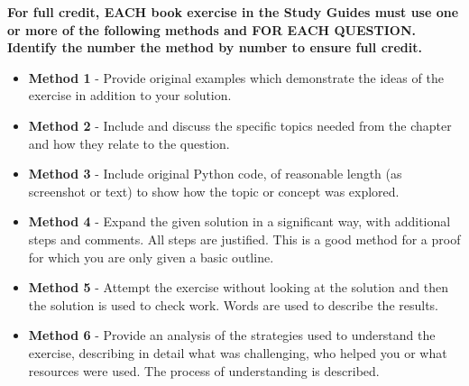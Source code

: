 \textbf{For full credit,  EACH book exercise in the Study Guides must use one or more of the following methods and FOR EACH QUESTION.  Identify the number the method by number to ensure full credit.}

\begin{itemize}
    \item \textbf{Method 1} - Provide original examples which demonstrate the ideas of the exercise in addition to your solution.
    \item \textbf{Method 2} - Include and discuss the specific topics needed from the chapter and how they relate to the question.
    \item \textbf{Method 3} - Include original Python code, of reasonable length (as screenshot or text)  to show how the topic or concept was explored.
    \item \textbf{Method 4} - Expand the given solution in a significant way, with additional steps and comments. All steps are justified. This is a good method for a proof for which you are only given a basic outline.
    \item \textbf{Method 5} - Attempt the exercise without looking at the solution and then the solution is used to check work. Words are used to describe the results.
    \item \textbf{Method 6} - Provide an analysis of the strategies used to understand the exercise, describing in detail what was challenging, who helped you or what resources were used. The process of understanding is
    described.
\end{itemize}

